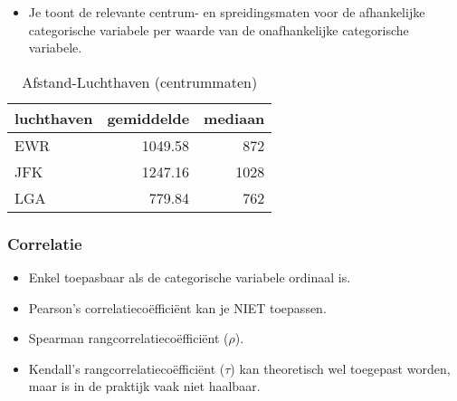 \documentclass[]{memoir}
\providecommand{\tightlist}{%
  \setlength{\itemsep}{0pt}\setlength{\parskip}{0pt}}
\begin{document}
\begin{itemize}
\tightlist
\item
  Je toont de relevante centrum- en spreidingsmaten voor de afhankelijke
  categorische variabele per waarde van de onafhankelijke categorische
  variabele.
\end{itemize}

\begin{table}[t]

\caption{\label{tab:4-17}Afstand-Luchthaven (centrummaten)}
\centering
\fontsize{10}{12}\selectfont
\begin{tabular}{lrr}
\toprule
luchthaven & gemiddelde & mediaan\\
\midrule
EWR & 1049.58 & 872\\
JFK & 1247.16 & 1028\\
LGA & 779.84 & 762\\
\bottomrule
\end{tabular}
\end{table}

\begin{table}[t]

\caption{\label{tab:4-18}Afstand-Luchthaven (spreidingsmaten)}
\centering
{}
\end{table}

\subsubsection*{Correlatie}\label{correlatie-1}

\begin{itemize}
\tightlist
\item
  Enkel toepasbaar als de categorische variabele ordinaal is.
\item
  Pearson's correlatiecoëfficiënt kan je NIET toepassen.
\item
  Spearman rangcorrelatiecoëfficiënt (\(\rho\)).
\item
  Kendall's rangcorrelatiecoëfficiënt (\(\tau\)) kan theoretisch wel
  toegepast worden, maar is in de praktijk vaak niet haalbaar.
\end{itemize}
\end{document}
